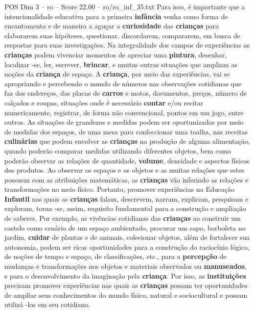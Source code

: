 \begin{textsample}{POS Dim 3 – ro – Score 22.00 – ro/ro\_inf\_35.txt}
Para isso, é importante que a intencionalidade educativa para a primeira \textbf{infância} venha como forma de encantamento e de maneira a aguçar a \textbf{curiosidade} das \textbf{crianças} para elaborarem suas hipóteses, questionar, discordarem, compararem, em busca de respostas para suas investigações.
Na integralidade dos campos de experiências as \textbf{crianças} podem vivenciar momentos de apreciar uma \textbf{pintura}, desenhar, localizar -se, ler, escrever, \textbf{brincar}, e muitas outras situações que ampliam as noções da \textbf{criança} de espaço.
A \textbf{criança}, por meio das experiências, vai se apropriando e percebendo o mundo de números nas observações cotidianas que faz dos endereços, das placas de \textbf{carros} e motos, documentos, preços, número de calçados e roupas, situações onde é necessário \textbf{contar} e/ou recitar numericamente, registrar, de forma não convencional, pontos em um jogo, entre outros.
As situações de grandezas e medidas podem ser oportunizadas por meio de medidas dos espaços, de uma mesa para confeccionar uma toalha, nas receitas \textbf{culinárias} que podem envolver as \textbf{crianças} na produção de alguma alimentação, quando poderão comparar medidas utilizando diferentes objetos, bem como poderão observar as relações de quantidade, \textbf{volume}, densidade e aspectos físicos dos produtos.
Ao observar os espaços e os objetos e as muitas relações que estes possuem com as atribuições matemáticas, as \textbf{crianças} vão inferindo as relações e transformações no meio físico.
Portanto, promover experiências na Educação \textbf{Infantil} nas quais as \textbf{crianças} falam, descrevem, narram, explicam, pesquisam e exploram, torna -se, assim, requisito fundamental para a construção e ampliação de saberes.
Por exemplo, as vivências cotidianas das \textbf{crianças} ao construir um castelo como cenário de um espaço ambientado, procurar um sapo, borboleta no jardim, \textbf{cuidar} de plantas e de animais, colecionar objetos, além de fortalecer sua autonomia, podem ser ricas oportunidades para a construção do raciocínio lógico, de noções de tempo e espaço, de classificações, etc., para a \textbf{percepção} de mudanças e transformações nos objetos e materiais observados ou \textbf{manuseados}, e para o desenvolvimento da imaginação pela \textbf{criança}.
Por isso, as \textbf{instituições} precisam promover experiências nas quais as \textbf{crianças} possam ter oportunidades de ampliar seus conhecimentos do mundo físico, natural e sociocultural e possam utilizá -los em seu cotidiano.

\end{textsample}
